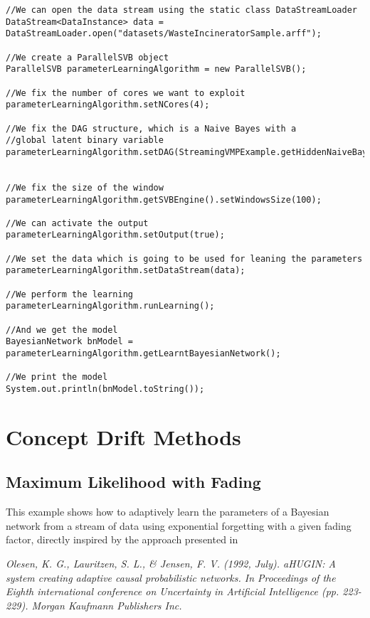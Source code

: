 \begin{lstlisting}
//We can open the data stream using the static class DataStreamLoader
DataStream<DataInstance> data = DataStreamLoader.open("datasets/WasteIncineratorSample.arff");

//We create a ParallelSVB object
ParallelSVB parameterLearningAlgorithm = new ParallelSVB();

//We fix the number of cores we want to exploit
parameterLearningAlgorithm.setNCores(4);

//We fix the DAG structure, which is a Naive Bayes with a 
//global latent binary variable
parameterLearningAlgorithm.setDAG(StreamingVMPExample.getHiddenNaiveBayesStructure(data));


//We fix the size of the window
parameterLearningAlgorithm.getSVBEngine().setWindowsSize(100);

//We can activate the output
parameterLearningAlgorithm.setOutput(true);

//We set the data which is going to be used for leaning the parameters
parameterLearningAlgorithm.setDataStream(data);

//We perform the learning
parameterLearningAlgorithm.runLearning();

//And we get the model
BayesianNetwork bnModel = parameterLearningAlgorithm.getLearntBayesianNetwork();

//We print the model
System.out.println(bnModel.toString());

\end{lstlisting}


\section{Concept Drift Methods}

\subsection{Maximum Likelihood with Fading}

This example shows how to adaptively learn the parameters of a Bayesian network from a stream of data using exponential forgetting with a given fading factor, directly inspired by the approach presented in

\textit{Olesen, K. G., Lauritzen, S. L., \& Jensen, F. V. (1992, July). aHUGIN: A system creating adaptive causal probabilistic networks. In Proceedings of the Eighth international conference on Uncertainty in Artificial Intelligence (pp. 223-229). Morgan Kaufmann Publishers Inc.}

